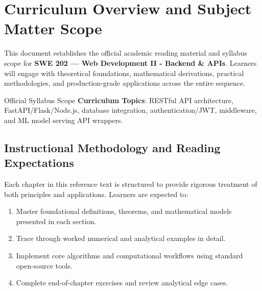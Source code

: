 \section{Curriculum Overview and Subject Matter Scope}

This document establishes the official academic reading material and syllabus scope for \textbf{SWE 202 --- Web Development II - Backend \& APIs}. Learners will engage with theoretical foundations, mathematical derivations, practical methodologies, and production-grade applications across the entire sequence.

\begin{InsightBox}{Official Syllabus Scope}
  \textbf{Curriculum Topics}: RESTful API architecture, FastAPI/Flask/Node.js, database integration, authentication/JWT, middleware, and ML model serving API wrappers.
\end{InsightBox}

\subsection{Instructional Methodology and Reading Expectations}

Each chapter in this reference text is structured to provide rigorous treatment of both principles and applications. Learners are expected to:
\begin{enumerate}
  \item Master foundational definitions, theorems, and mathematical models presented in each section.
  \item Trace through worked numerical and analytical examples in detail.
  \item Implement core algorithms and computational workflows using standard open-source tools.
  \item Complete end-of-chapter exercises and review analytical edge cases.
\end{enumerate}

